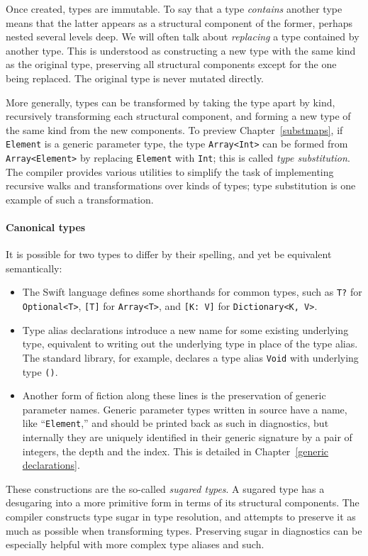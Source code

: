 \documentclass[../generics]{subfiles}
\begin{document}
Once created, types are immutable. To say that a type \emph{contains} another type means that the latter appears as a structural component of the former, perhaps nested several levels deep.  We will often talk about \emph{replacing} a type contained by another type. This is understood as constructing a new type with the same kind as the original type, preserving all structural components except for the one being replaced. The original type is never mutated directly.

More generally, types can be transformed by taking the type apart by kind, recursively transforming each structural component, and forming a new type of the same kind from the new components. To preview Chapter~\ref{substmaps}, if \texttt{Element} is a generic parameter type, the type \texttt{Array<Int>} can be formed from \texttt{Array<Element>} by replacing \texttt{Element} with \texttt{Int}; this is called \emph{type substitution}. The compiler provides various utilities to simplify the task of implementing recursive walks and transformations over kinds of types; type substitution is one example of such a transformation.

\paragraph{Canonical types} It is possible for two types to differ by their spelling, and yet be equivalent semantically:
\begin{itemize}
\item The Swift language defines some shorthands for common types, such as \texttt{T?} for \texttt{Optional<T>}, \texttt{[T]} for \texttt{Array<T>}, and \texttt{[K:\ V]} for \texttt{Dictionary<K, V>}.
\item {}Type alias declarations introduce a new name for some existing underlying type, equivalent to writing out the underlying type in place of the type alias. The standard library, for example, declares a type alias \texttt{Void} with underlying type \texttt{()}.
\item Another form of fiction along these lines is the preservation of generic parameter names. Generic parameter types written in source have a name, like ``\texttt{Element},'' and should be printed back as such in diagnostics, but internally they are uniquely identified in their generic signature by a pair of integers, the depth and the index. This is detailed in Chapter~\ref{generic declarations}.
\end{itemize}
These constructions are the so-called \emph{sugared types}. A sugared type has a desugaring into a more primitive form in terms of its structural components. The compiler constructs type sugar in type resolution, and attempts to preserve it as much as possible when transforming types. Preserving sugar in diagnostics can be especially helpful with more complex type aliases and such.
\end{document}
